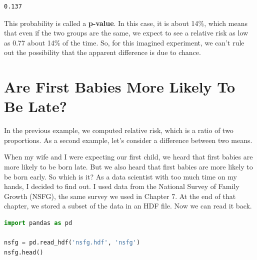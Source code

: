 \begin{lstlisting}[style=output]
0.137
\end{lstlisting}

This probability is called a \textbf{p-value}. In this case, it is about
14\%, which means that even if the two groups are the same, we expect to
see a relative risk as low as 0.77 about 14\% of the time. So, for this
imagined experiment, we can't rule out the possibility that the apparent
difference is due to chance.

\section{Are First Babies More Likely To Be
Late?}\label{are-first-babies-more-likely-to-be-late}

In the previous example, we computed relative risk, which is a ratio of
two proportions. As a second example, let's consider a difference
between two means.

When my wife and I were expecting our first child, we heard that first
babies are more likely to be born late. But we also heard that first
babies are more likely to be born early. So which is it? As a data
scientist with too much time on my hands, I decided to find out. I used
data from the National Survey of Family Growth (NSFG), the same survey
we used in Chapter 7. At the end of that chapter, we stored a subset of
the data in an HDF file. Now we can read it back.

\begin{lstlisting}[language=Python,style=source]
import pandas as pd

nsfg = pd.read_hdf('nsfg.hdf', 'nsfg')
nsfg.head()
\end{lstlisting}

